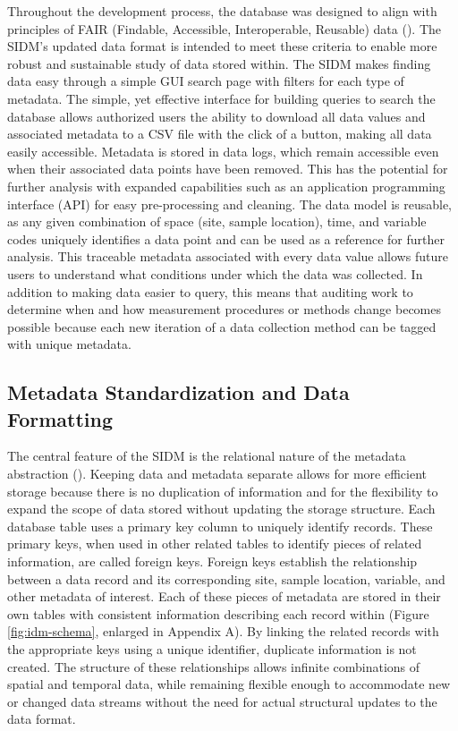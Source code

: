 Throughout the development process, the database was designed to align with principles of FAIR (Findable, Accessible, Interoperable, Reusable) data (\cite{Wilkinson2016}). 
The SIDM's updated data format is intended to meet these criteria to enable more robust and sustainable study of data stored within.
The SIDM makes finding data easy through a simple GUI search page with filters for each type of metadata.
The simple, yet effective interface for building queries to search the database allows authorized users the ability to download all data values and associated metadata to a CSV file with the click of a button, making all data easily accessible.
Metadata is stored in data logs, which remain accessible even when their associated data points have been removed.
This has the potential for further analysis with expanded capabilities such as an application programming interface (API) for easy pre-processing and cleaning.
The data model is reusable, as any given combination of space (site, sample location), time, and variable codes uniquely identifies a data point and can be used as a reference for further analysis.
This traceable metadata associated with every data value allows future users to understand what conditions under which the data was collected.
In addition to making data easier to query, this means that auditing work to determine when and how measurement procedures or methods change becomes possible because each new iteration of a data collection method can be tagged with unique metadata.

\subsection{Metadata Standardization and Data Formatting}

The central feature of the SIDM is the relational nature of the metadata abstraction (\cite{Horsburgh2008a}).
Keeping data and metadata separate allows for more efficient storage because there is no duplication of information and for the flexibility to expand the scope of data stored without updating the storage structure.
Each database table uses a primary key column to uniquely identify records.
These primary keys, when used in other related tables to identify pieces of related information, are called foreign keys.
Foreign keys establish the relationship between a data record and its corresponding site, sample location, variable, and other metadata of interest.
Each of these pieces of metadata are stored in their own tables with consistent information describing each record within (Figure \ref{fig:idm-schema}, enlarged in Appendix A).
By linking the related records with the appropriate keys using a unique identifier, duplicate information is not created.
The structure of these relationships allows infinite combinations of spatial and temporal data, while remaining flexible enough to accommodate new or changed data streams without the need for actual structural updates to the data format.


